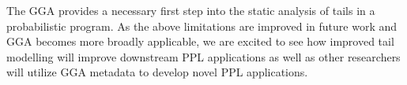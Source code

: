 \documentclass[../thesis.tex]{subfiles}
\begin{document}
The GGA provides a necessary first step into the static analysis of tails in
a probabilistic program.
As the above limitations are improved in future work and GGA becomes more broadly applicable,
we are excited to see how improved tail modelling will improve downstream PPL applications
as well as
other researchers will utilize GGA metadata to develop
novel PPL applications.






% 
% 
\end{document}
